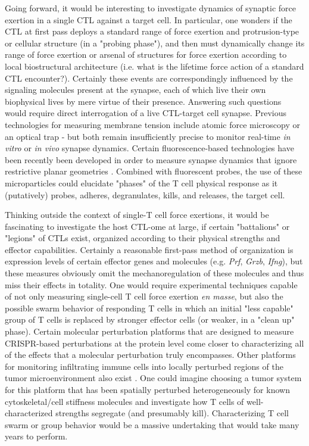 Going forward, it would be interesting to investigate dynamics of synaptic force exertion in a single CTL against a target cell. In particular, one wonders if the CTL at first pass deploys a standard range of force exertion and protrusion-type or cellular structure (in a "probing phase"), and then must dynamically change its range of force exertion or arsenal of structures for force exertion according to local biostructural architecture (i.e. what is the lifetime force action of a standard CTL encounter?). Certainly these events are correspondingly influenced by the signaling molecules present at the synapse, each of which live their own biophysical lives by mere virtue of their presence. Answering such questions would require direct interrogation of a live CTL-target cell synapse. Previous technologies for measuring membrane tension include atomic force microscopy or an optical trap - but both remain insufficiently precise to monitor real-time \textit{in vitro} or \textit{in vivo} synapse dynamics. Certain fluorescence-based technologies have been recently been developed in order to measure synapse dynamics that ignore restrictive planar geometries \cite{Vorselen2020}. Combined with fluorescent probes, the use of these microparticles could elucidate "phases" of the T cell physical response as it (putatively) probes, adheres, degranulates, kills, and releases, the target cell.

Thinking outside the context of single-T cell force exertions, it would be fascinating to investigate the host CTL-ome at large, if certain "battalions" or "legions" of CTLs exist, organized according to their physical strengths and effector capabilities. Certainly a reasonable first-pass method of organization is expression levels of certain effector genes and molecules (e.g. \textit{Prf}, \textit{Grzb}, \textit{Ifng}), but these measures obviously omit the  mechanoregulation of these molecules and thus miss their effects in totality. One would require experimental techniques capable of not only measuring single-cell T cell force exertion \textit{en masse}, but also the possible swarm behavior of responding T cells in which an initial "less capable" group of T cells is replaced by stronger effector cells (or weaker, in a "clean up" phase). Certain molecular perturbation platforms that are designed to measure CRISPR-based perturbations at the protein level \cite{Wroblewska2018} come closer to characterizing all of the effects that a molecular perturbation truly encompasses. Other platforms for monitoring infiltrating immune cells into locally perturbed regions of the tumor microenvironment also exist \cite{MaximeDhainaut2021}. One could imagine choosing a tumor system for this platform that has been spatially perturbed heterogeneously for known cytoskeletal/cell stiffness molecules and investigate how T cells of well-characterized strengths segregate (and presumably kill). Characterizing T cell swarm or group behavior would be a massive undertaking that would take many years to perform.

